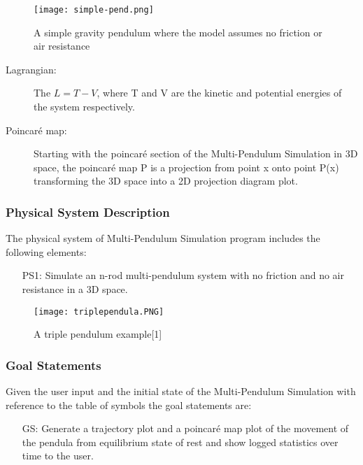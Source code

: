 \documentclass[12pt]{article}
\newcounter{goalnum} %
\newcommand{\progname}{Multi-Pendulum Simulation }
\begin{document}
\begin{figure}[H]
	\centering
	\texttt{[image: simple-pend.png]}
\caption{A simple gravity pendulum where the model assumes no friction or air
resistance}
	\label{fig:maxresdefault}
\end{figure}

\begin{description}
\item[Lagrangian:] The $L=T-V$, where T and V are the kinetic and potential
energies of the system respectively.
\item[Poincaré map:] Starting with the poincaré section of the \progname in 3D space, the poincaré map P
is a projection from point x onto point P(x) transforming the 3D space into a 2D projection diagram plot.
\end{description}

\subsubsection{Physical System Description}

The physical system of \progname program includes the following elements:

\begin{itemize}
\item[PS1:] Simulate an n-rod multi-pendulum system with no friction and no air
resistance in a 3D space.
\end{itemize}

\begin{figure}[H]
	\centering
	\texttt{[image: triplependula.PNG]}
\caption{A triple pendulum example[1]}
	\label{fig:maxresdefault}
\end{figure}

\subsubsection{Goal Statements}

\noindent Given the user input and the initial state of the \progname with reference to the table of symbols the goal
statements are:

\begin{itemize}

\item[GS\refstepcounter{goalnum}\thegoalnum:] Generate a trajectory plot and a poincaré map plot of 
the movement of the pendula from equilibrium state of rest and show logged
statistics over time to the user.
\end{itemize}
\end{document}
